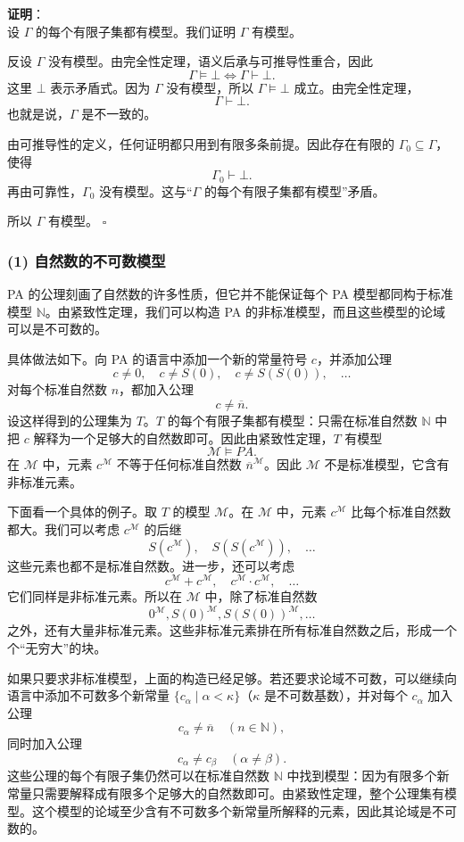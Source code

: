 \documentclass[12pt, a4paper]{article}
\begin{document}
\textbf{证明}：\\
设 \(\Gamma\) 的每个有限子集都有模型。我们证明 \(\Gamma\) 有模型。

反设 \(\Gamma\) 没有模型。由完全性定理，语义后承与可推导性重合，因此
\[
\Gamma \models \bot \iff \Gamma \vdash \bot .
\]
这里 \(\bot\) 表示矛盾式。因为 \(\Gamma\) 没有模型，所以 \(\Gamma \models \bot\) 成立。由完全性定理，
\[
\Gamma \vdash \bot .
\]
也就是说，\(\Gamma\) 是不一致的。

由可推导性的定义，任何证明都只用到有限多条前提。因此存在有限的 \(\Gamma_0 \subseteq \Gamma\)，使得
\[
\Gamma_0 \vdash \bot .
\]
再由可靠性，\(\Gamma_0\) 没有模型。这与“\(\Gamma\) 的每个有限子集都有模型”矛盾。

所以 \(\Gamma\) 有模型。 \hfill \(\square\)


\subsubsection*{(1) 自然数的不可数模型}

PA 的公理刻画了自然数的许多性质，但它并不能保证每个 PA 模型都同构于标准模型 \(\mathbb{N}\)。由紧致性定理，我们可以构造 PA 的非标准模型，而且这些模型的论域可以是不可数的。

具体做法如下。向 PA 的语言中添加一个新的常量符号 \(c\)，并添加公理
\[
c\neq 0,\quad c\neq S(0),\quad c\neq S(S(0)),\quad \dots
\]
对每个标准自然数 \(n\)，都加入公理
\[
c\neq \overline{n}.
\]
设这样得到的公理集为 \(T\)。\(T\) 的每个有限子集都有模型：只需在标准自然数 \(\mathbb{N}\) 中把 \(c\) 解释为一个足够大的自然数即可。因此由紧致性定理，\(T\) 有模型
\[
\mathcal{M}\models PA.
\]
在 \(\mathcal{M}\) 中，元素 \(c^{\mathcal{M}}\) 不等于任何标准自然数 \(\overline{n}^{\mathcal{M}}\)。因此 \(\mathcal{M}\) 不是标准模型，它含有非标准元素。

下面看一个具体的例子。取 \(T\) 的模型 \(\mathcal{M}\)。在 \(\mathcal{M}\) 中，元素 \(c^{\mathcal{M}}\) 比每个标准自然数都大。我们可以考虑 \(c^{\mathcal{M}}\) 的后继
\[
S(c^{\mathcal{M}}),\quad S(S(c^{\mathcal{M}})),\quad \dots
\]
这些元素也都不是标准自然数。进一步，还可以考虑
\[
c^{\mathcal{M}}+c^{\mathcal{M}},\quad c^{\mathcal{M}}\cdot c^{\mathcal{M}},\quad \dots
\]
它们同样是非标准元素。所以在 \(\mathcal{M}\) 中，除了标准自然数
\[
0^{\mathcal{M}}, S(0)^{\mathcal{M}}, S(S(0))^{\mathcal{M}}, \dots
\]
之外，还有大量非标准元素。这些非标准元素排在所有标准自然数之后，形成一个个“无穷大”的块。

如果只要求非标准模型，上面的构造已经足够。若还要求论域不可数，可以继续向语言中添加不可数多个新常量 \(\{c_\alpha \mid \alpha < \kappa\}\)（\(\kappa\) 是不可数基数），并对每个 \(c_\alpha\) 加入公理
\[
c_\alpha \neq \overline{n}\quad (n\in\mathbb{N}),
\]
同时加入公理
\[
c_\alpha \neq c_\beta\quad (\alpha\neq\beta).
\]
这些公理的每个有限子集仍然可以在标准自然数 \(\mathbb{N}\) 中找到模型：因为有限多个新常量只需要解释成有限多个足够大的自然数即可。由紧致性定理，整个公理集有模型。这个模型的论域至少含有不可数多个新常量所解释的元素，因此其论域是不可数的。
\end{document}
